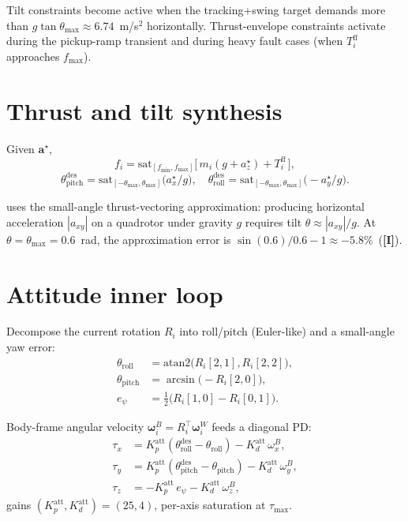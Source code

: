 \documentclass[11pt,a4paper,oneside]{report}
\newcommand{\ba}{\bm{a}}
\newcommand{\bomega}{\bm{\omega}}
\newcommand{\sat}{\mathrm{sat}}
\newcommand{\Inf}{\textcolor{orange!70!black}{\textbf{[I]}}}
\begin{document}
Tilt constraints become active when the tracking+swing target demands
more than $g\tan\theta_\text{max} \approx 6.74$~m/s$^2$ horizontally.
Thrust-envelope constraints activate during the pickup-ramp transient
and during heavy fault cases (when $T_i^\text{ff}$ approaches
$f_\text{max}$).

\section{Thrust and tilt synthesis}

Given $\ba^\star$,
\begin{equation}
f_i = \sat_{[f_\text{min},f_\text{max}]}\!
\big[\, m_i(g+a_z^\star) + T_i^\text{ff} \,\big],
\label{eq:thrust}
\end{equation}
\begin{equation}
\theta^\text{des}_\text{pitch} = \sat_{[-\theta_\text{max},\theta_\text{max}]}\!
\big(a_x^\star/g\big),\quad
\theta^\text{des}_\text{roll} = \sat_{[-\theta_\text{max},\theta_\text{max}]}\!
\big(-a_y^\star/g\big).
\label{eq:tilt}
\end{equation}

 uses the small-angle thrust-vectoring approximation:
producing horizontal acceleration $|a_{xy}|$ on a quadrotor under
gravity $g$ requires tilt $\theta\approx |a_{xy}|/g$. At
$\theta=\theta_\text{max}=0.6$~rad, the approximation error is
$\sin(0.6)/0.6 - 1 \approx -5.8\%$~(\Inf).

\section{Attitude inner loop}

Decompose the current rotation $R_i$ into roll/pitch (Euler-like) and
a small-angle yaw error:
\begin{align}
\theta_\text{roll} &= \mathrm{atan2}\big(R_i[2,1],R_i[2,2]\big), \\
\theta_\text{pitch} &= \arcsin\big(-R_i[2,0]\big), \\
e_\psi &= \tfrac{1}{2}\big(R_i[1,0]-R_i[0,1]\big).
\end{align}

Body-frame angular velocity $\bomega_i^B = R_i^{\!\top}\bomega_i^W$
feeds a diagonal PD:
\begin{equation}
\begin{aligned}
\tau_x &= K_p^\text{att}(\theta^\text{des}_\text{roll}-\theta_\text{roll})
- K_d^\text{att}\,\omega^B_x, \\
\tau_y &= K_p^\text{att}(\theta^\text{des}_\text{pitch}-\theta_\text{pitch})
- K_d^\text{att}\,\omega^B_y, \\
\tau_z &= -K_p^\text{att}\,e_\psi - K_d^\text{att}\,\omega^B_z,
\end{aligned}
\label{eq:attitude}
\end{equation}
gains $(K_p^\text{att},K_d^\text{att}) = (25,4)$, per-axis saturation
at $\tau_\text{max}$.
\end{document}
